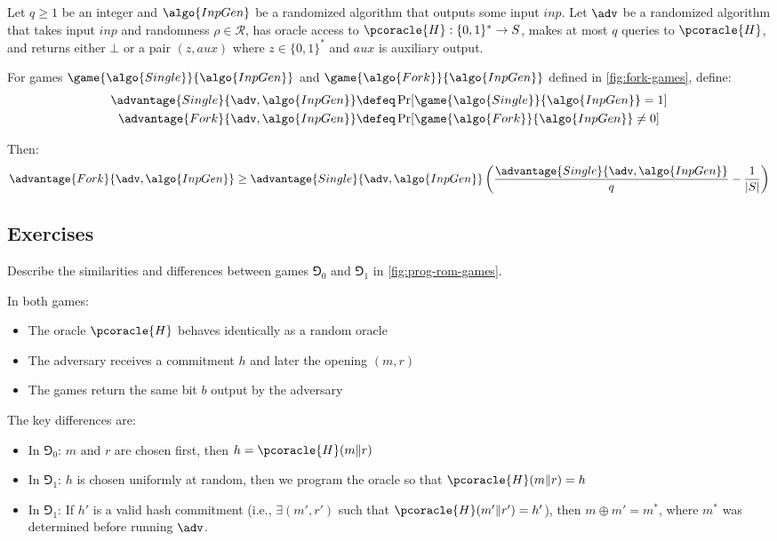 \begin{lemma}\label{lem:fork}
  Let $q \geq 1$ be an integer and $\algo{InpGen}$ be a randomized algorithm that outputs some input $\mathit{inp}$.
  Let $\adv$ be a randomized algorithm that takes input $\mathit{inp}$ and randomness $\rho \in \mathcal{R}$, has oracle access to $\pcoracle{H}: \{0,1\}^* \rightarrow S$, makes at most $q$ queries to $\pcoracle{H}$, and returns either $\bot$ or a pair $(z, \mathit{aux})$ where $z \in \{0,1\}^*$ and $\mathit{aux}$ is auxiliary output.
  
  For games $\game{\algo{Single}}{\algo{InpGen}}$ and $\game{\algo{Fork}}{\algo{InpGen}}$ defined in \autoref{fig:fork-games}, define:
  \begin{align*}
    \advantage{Single}{\adv, \algo{InpGen}} &\defeq \Pr[\game{\algo{Single}}{\algo{InpGen}} = 1] \\
    \advantage{Fork}{\adv, \algo{InpGen}} &\defeq \Pr[\game{\algo{Fork}}{\algo{InpGen}} \neq 0]
  \end{align*}
  
  Then:
  \[
  \advantage{Fork}{\adv, \algo{InpGen}} \geq \advantage{Single}{\adv, \algo{InpGen}} \left( \frac{\advantage{Single}{\adv, \algo{InpGen}}}{q} - \frac{1}{|S|} \right)
  \]
\end{lemma}

\subsection{Exercises}

\begin{exercise}
  Describe the similarities and differences between games $\Game_0$ and $\Game_1$ in \autoref{fig:prog-rom-games}.
\end{exercise}

\ifsolutions
\begin{mysolution}
  In both games:
  \begin{itemize}
    \item The oracle $\pcoracle{H}$ behaves identically as a random oracle
    \item The adversary receives a commitment $h$ and later the opening $(m, r)$
    \item The games return the same bit $b$ output by the adversary
  \end{itemize}
  
  The key differences are:
  \begin{itemize}
    \item In $\Game_0$: $m$ and $r$ are chosen first, then $h = \pcoracle{H}(m \| r)$
    \item In $\Game_1$: $h$ is chosen uniformly at random, then we program the oracle so that $\pcoracle{H}(m \| r) = h$
    \item In $\Game_1$: If $h'$ is a valid hash commitment (i.e., $\exists (m', r')$ such that $\pcoracle{H}(m' \| r') = h'$), then $m \oplus m' = m^*$, where $m^*$ was determined before running $\adv$.
  \end{itemize}
\end{mysolution}
\fi

